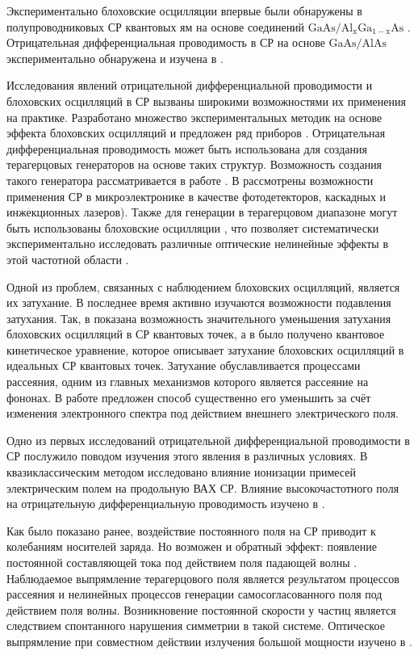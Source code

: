 Экспериментально блоховские осцилляции впервые были обнаружены в полупроводниковых СР квантовых ям на основе соединений \( \mathrm{Ga As / Al_x Ga_{1-x} As} \) \cite{feldmann}. Отрицательная дифференциальная проводимость в СР на основе \( \mathrm{GaAs/AlAs} \) экспериментально обнаружена и изучена в \cite{sibille}.

Исследования явлений отрицательной дифференциальной проводимости и блоховских осцилляций в СР вызваны широкими возможностями их применения на практике. Разработано множество экспериментальных методик на основе эффекта блоховских осцилляций и предложен ряд приборов \cite{andronov,elesin}. Отрицательная дифференциальная проводимость может быть использована для создания терагерцовых генераторов на основе таких структур. Возможность создания такого генератора рассматривается в работе \cite{andronov}. В \cite{suris} рассмотрены возможности применения СР в микроэлектронике в качестве фотодетекторов, каскадных и инжекционных лазеров). Также для генерации в терагерцовом диапазоне могут быть использованы блоховские осцилляции \cite{bouchard,martini}, что позволяет систематически экспериментально исследовать различные оптические нелинейные эффекты в этой частотной области \cite{keay}.

Одной из проблем, связанных с наблюдением блоховских осцилляций, является их затухание. В последнее время активно изучаются возможности подавления затухания. Так, в \cite{dmitriev} показана возможность значительного уменьшения затухания блоховских осцилляций в СР квантовых точек, а в \cite{suris-dmitriev} было получено квантовое кинетическое уравнение, которое описывает затухание блоховских осцилляций в идеальных СР квантовых точек. Затухание обуславливается процессами рассеяния, одним из главных механизмов которого является рассеяние на фононах. В работе \cite{suris-dmitriev} предложен способ существенно его уменьшить за счёт изменения электронного спектра под действием внешнего электрического поля.

Одно из первых исследований отрицательной дифференциальной проводимости в СР \cite{esaki} послужило поводом изучения этого явления в различных условиях. В \cite{mensah1} квазиклассическим методом исследовано влияние ионизации примесей электрическим полем на продольную ВАХ СР. Влияние высокочастотного поля на отрицательную дифференциальную проводимость изучено в \cite{ktitorov}. 

Как было показано ранее, воздействие постоянного поля на СР приводит к колебаниям носителей заряда. Но возможен и обратный эффект: появление постоянной составляющей тока под действием поля падающей волны \cite{alekseev}. Наблюдаемое выпрямление терагерцового поля является результатом процессов рассеяния и нелинейных процессов генерации самосогласованного поля под действием поля волны. Возникновение постоянной скорости у частиц является следствием спонтанного нарушения симметрии в такой системе. Оптическое выпрямление при совместном действии излучения большой мощности изучено в \cite{shmelev}.

